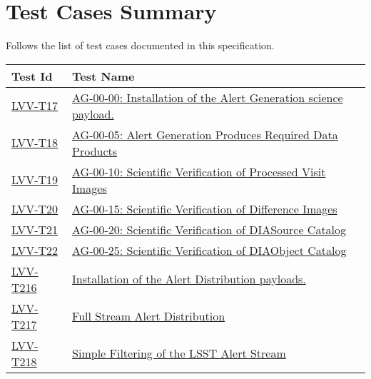 \section{Test Cases Summary}\label{test-cases-summary}

Follows the list of test cases documented in this specification.

\begin{longtable}[]{p{3cm}p{13cm}}
\toprule
Test Id & Test Name\tabularnewline
\midrule
\endhead
\hyperref[lvv-t17]{LVV-T17} & 
\href{https://jira.lsstcorp.org/secure/Tests.jspa#/testCase/LVV-T17}{AG-00-00: Installation of the Alert Generation science payload.} \tabularnewline
\hyperref[lvv-t18]{LVV-T18} & 
\href{https://jira.lsstcorp.org/secure/Tests.jspa#/testCase/LVV-T18}{AG-00-05: Alert Generation Produces Required Data Products} \tabularnewline
\hyperref[lvv-t19]{LVV-T19} & 
\href{https://jira.lsstcorp.org/secure/Tests.jspa#/testCase/LVV-T19}{AG-00-10: Scientific Verification of Processed Visit Images} \tabularnewline
\hyperref[lvv-t20]{LVV-T20} & 
\href{https://jira.lsstcorp.org/secure/Tests.jspa#/testCase/LVV-T20}{AG-00-15: Scientific Verification of Difference Images} \tabularnewline
\hyperref[lvv-t21]{LVV-T21} & 
\href{https://jira.lsstcorp.org/secure/Tests.jspa#/testCase/LVV-T21}{AG-00-20: Scientific Verification of DIASource Catalog} \tabularnewline
\hyperref[lvv-t22]{LVV-T22} & 
\href{https://jira.lsstcorp.org/secure/Tests.jspa#/testCase/LVV-T22}{AG-00-25: Scientific Verification of DIAObject Catalog} \tabularnewline
\hyperref[lvv-t216]{LVV-T216} & 
\href{https://jira.lsstcorp.org/secure/Tests.jspa#/testCase/LVV-T216}{Installation of the Alert Distribution payloads.} \tabularnewline
\hyperref[lvv-t217]{LVV-T217} & 
\href{https://jira.lsstcorp.org/secure/Tests.jspa#/testCase/LVV-T217}{Full Stream Alert Distribution} \tabularnewline
\hyperref[lvv-t218]{LVV-T218} & 
\href{https://jira.lsstcorp.org/secure/Tests.jspa#/testCase/LVV-T218}{Simple Filtering of the LSST Alert Stream} \tabularnewline
\bottomrule
\end{longtable}
